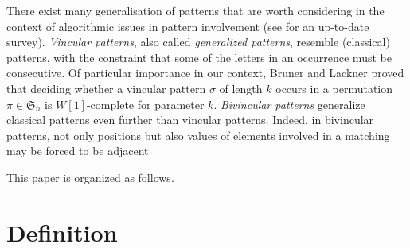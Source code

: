 \documentclass[a4paper]{llncs}
\newcommand{\ptext}{\pi}
\newcommand{\pmotif}{\sigma}
\begin{document}
	There exist many generalisation of patterns that are worth considering
	in the context of algorithmic issues in pattern involvement
	(see \cite{Kitaev:book:2011} for an up-to-date survey).
	\emph{Vincular patterns}, also called 
	\emph{generalized patterns},
	resemble (classical) patterns, with the constraint that some of the letters in
	an occurrence must be consecutive.
	Of particular importance in our context,
	Bruner and Lackner \cite{Bruner:Lackner:SWAT:2012}
	proved that deciding whether a vincular pattern
	$\sigma$ of length $k$ occurs in a permutation
	$\pi \in \mathfrak{S}_n$ is $W[1]$-complete for
	parameter $k$.
	\emph{Bivincular patterns} generalize classical patterns even further 
	than vincular
	patterns. Indeed, in bivincular patterns,
	not only positions but also values
	of elements involved in a matching may be forced to be adjacent

	This paper is organized as follows.
	
%	 
%
%	
	

	
\section{Definition}
\label{section:Definitions}
\end{document}
